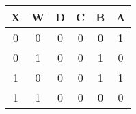 \begin{center}
\begin{tabular}{|c|c||c|c|c|c|}
\hline
X & W & D & C & B & A\\
\hline
0 & 0 & 0 & 0 & 0 & 1\\
0 & 1 & 0 & 0 & 1 & 0\\
1 & 0 & 0 & 0 & 1 & 1\\
1 & 1 & 0 & 0 & 0 & 0\\
\hline
\end{tabular}
\end{center}

